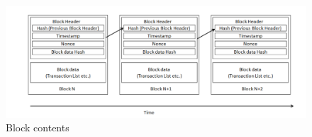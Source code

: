 \begin{center}
	\begin{figure}[htb!]
		
		\begin{minipage}{0.55\linewidth}
			\centering
			\includegraphics[width=1.95\textwidth]{images/chap01_BlockChain.png}
		\end{minipage}
		\caption[Block contents]{Block contents}
		
	\end{figure}
	
\end{center}
